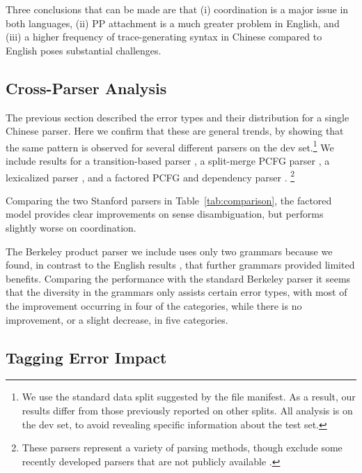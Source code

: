 Three conclusions that can be made are that (i) coordination is a major issue in
both languages, (ii) PP attachment is a much greater problem in English, and
(iii) a higher frequency of trace-generating
syntax in Chinese compared to English poses substantial challenges.

\subsection{Cross-Parser Analysis} \label{sec:cross_parser_analysis}
The previous section described the error types and their distribution for a single Chinese parser.
Here we confirm that these are general trends, by showing that the same pattern
is observed for several different parsers on the  dev set.\footnote{
    We use the standard data split suggested by the  file manifest.
    As a result, our results differ from those previously reported on other splits.
		All analysis is on the dev set, to avoid revealing specific information
		about the test set.
}
We include results for
a transition-based parser \parencite[ZPAR;][]{Zhang-Clark:2009:ICPT},
a split-merge PCFG parser \parencite{Petrov-etal:2006,Petrov-Klein:2007,Petrov:2010:NAACLHLT},
a lexicalized parser \parencite{Bikel-Chiang:2000:CLP},
and a factored PCFG and dependency parser
\parencite{Levy-Manning:2003:ACL,Klein-Manning:2003:ACL,Klein-Manning:2003:NIPS}.
\footnote{These parsers represent a variety of parsing methods, though exclude
some recently developed parsers that are not publicly
available \parencite{Qian-Liu:2012:EMNLP,Xiong-etal:2005:IJCNLP}.}

Comparing the two Stanford parsers in Table~\ref{tab:comparison}, the factored
model provides clear improvements on sense disambiguation, but performs
slightly worse on coordination.

The Berkeley product parser we include uses only two grammars because we found,
in contrast to the English results \parencite{Petrov:2010:NAACLHLT}, that further
grammars provided limited benefits.  Comparing the performance with the
standard Berkeley parser it seems that the diversity in the grammars only
assists certain error types, with most of the improvement occurring in four of
the categories, while there is no improvement, or a slight decrease, in five categories.

\subsection{Tagging Error Impact} \label{sec:pos_ablation_study}

